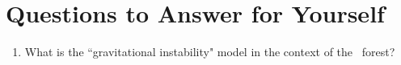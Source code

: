 \documentclass[11pt]{article}
\begin{document}
\section*{Questions to Answer for Yourself}
\begin{enumerate}[-]
\item What is the ``gravitational instability" model in the context of the \lya\ forest?
\end{enumerate}
\end{document}
